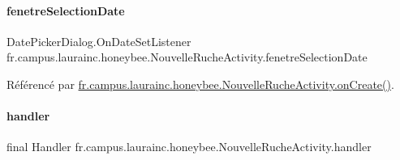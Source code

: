 \paragraph{\texorpdfstring{fenetre\+Selection\+Date}{fenetreSelectionDate}}
{\footnotesize\ttfamily Date\+Picker\+Dialog.\+On\+Date\+Set\+Listener fr.\+campus.\+laurainc.\+honeybee.\+Nouvelle\+Ruche\+Activity.\+fenetre\+Selection\+Date\hspace{0.3cm}{\ttfamily [private]}}



Référencé par \hyperlink{classfr_1_1campus_1_1laurainc_1_1honeybee_1_1_nouvelle_ruche_activity_ae97fec78fb0a2e1cc4610182bc71ea0d}{fr.\+campus.\+laurainc.\+honeybee.\+Nouvelle\+Ruche\+Activity.\+on\+Create()}.

\mbox{\label{classfr_1_1campus_1_1laurainc_1_1honeybee_1_1_nouvelle_ruche_activity_a71c7cb93b67cfe6c419c3c6f8504bbc0}} 
\paragraph{\texorpdfstring{handler}{handler}}
{\footnotesize\ttfamily final Handler fr.\+campus.\+laurainc.\+honeybee.\+Nouvelle\+Ruche\+Activity.\+handler\hspace{0.3cm}{\ttfamily [private]}}

